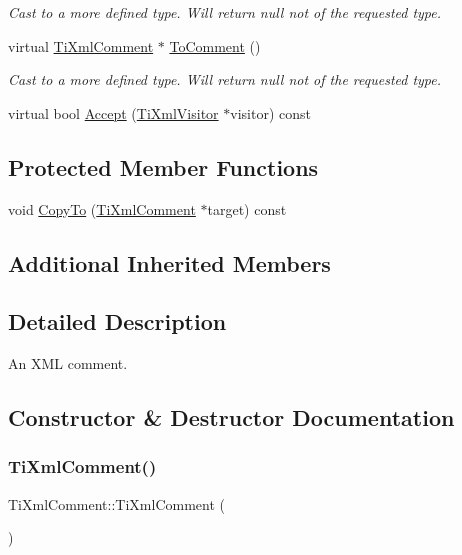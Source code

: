\begin{DoxyCompactItemize}
\begin{DoxyCompactList}\small\item\em Cast to a more defined type. Will return null not of the requested type. \end{DoxyCompactList}\item 
virtual \hyperlink{class_ti_xml_comment}{Ti\+Xml\+Comment} $\ast$ \hyperlink{class_ti_xml_comment_acc7c7e07e13c23f17797d642981511df}{To\+Comment} ()
\begin{DoxyCompactList}\small\item\em Cast to a more defined type. Will return null not of the requested type. \end{DoxyCompactList}\item 
virtual bool \hyperlink{class_ti_xml_comment_ac894241530d1d266131a5026cb251a95}{Accept} (\hyperlink{class_ti_xml_visitor}{Ti\+Xml\+Visitor} $\ast$visitor) const
\end{DoxyCompactItemize}
\subsection*{Protected Member Functions}
\begin{DoxyCompactItemize}
\item 
void \hyperlink{class_ti_xml_comment_aaeb8a0b2d503f603879a2d04ceb54295}{Copy\+To} (\hyperlink{class_ti_xml_comment}{Ti\+Xml\+Comment} $\ast$target) const
\end{DoxyCompactItemize}
\subsection*{Additional Inherited Members}


\subsection{Detailed Description}
An X\+ML comment. 

\subsection{Constructor \& Destructor Documentation}
\mbox{\label{class_ti_xml_comment_aaa3252031d3e8bd3a2bf51a1c61201b7}} 
\subsubsection{\texorpdfstring{Ti\+Xml\+Comment()}{TiXmlComment()}\hspace{0.1cm}{\footnotesize\ttfamily [1/3]}}
{\footnotesize\ttfamily Ti\+Xml\+Comment\+::\+Ti\+Xml\+Comment (\begin{DoxyParamCaption}{ }\end{DoxyParamCaption})\hspace{0.3cm}{\ttfamily [inline]}}




